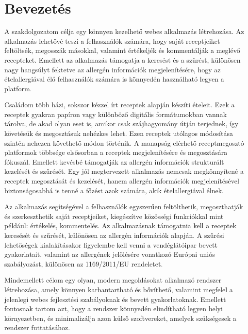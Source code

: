 ﻿\chapter{Bevezetés}\label{ch:introduction}

A szakdolgozatom célja egy könnyen kezelhető webes alkalmazás létrehozása. Az alkalmazás lehetővé teszi a felhasználók számára, hogy saját receptjeiket feltöltsék, megosszák másokkal, valamint értékeljék és kommentálják a meglévő recepteket. Emellett az alkalmazás támogatja a keresést és a szűrést, különösen nagy hangsúlyt fektetve az allergén információk megjelenítésére, hogy az ételallergiával élő felhasználók számára is könnyedén használható legyen a platform.


Családom több házi, sokszor kézzel írt receptek alapján készíti ételeit. Ezek a receptek gyakran papíron vagy különböző digitális formátumokban vannak tárolva, de akad olyan eset is, amikor csak szájhagyomány útján terjednek, így követésük és megosztásuk nehézkes lehet. Ezen receptek utólagos módosítása szintén nehezen követhető módon történik. A manapság elérhető receptmegosztó platformok többsége elsősorban a receptek megjelenítésére és megosztására fókuszál. Emellett kevésbé támogatják az allergén információk strukturált kezelését és szűrését. Egy jól megtervezett alkalmazás nemcsak megkönnyítené a receptek megosztását és kezelését, hanem allergén információk megjelenítésével biztonságosabbá is tenné a főzést azok számára, akik ételallergiával élnek.


Az alkalmazás segítségével a felhasználók egyszerűen feltölthetik, megoszthatják és szerkeszthetik saját receptjeiket, kiegészítve közösségi funkciókkal mint például: értékelés, kommentelés. Az alkalmazásnak támogatnia kell a receptek keresését és szűrését, különösen az allergén információk alapján. A szűrési lehetőségek kialakításakor figyelembe kell venni a vendéglátóipar bevett gyakorlatait, valamint az allergének jelölésére vonatkozó Európai uniós szabályozást, különösen az 1169/2011/EU rendeletet\cite{eu1169}.

Mindemellett célom egy olyan, modern megoldásokat alkalmazó rendszer létrehozása, amely könnyen karbantartható és bővíthető, valamint megfelel a jelenlegi
webes fejlesztési szabályoknak és bevett gyakorlatoknak. Emellett fontosnak tartom azt, hogy a rendszer könnyedén elindítható legyen helyi környezetben, és minimalizálja azon külső szoftvereket, amelyek szükségesek a rendszer futtatásához.
